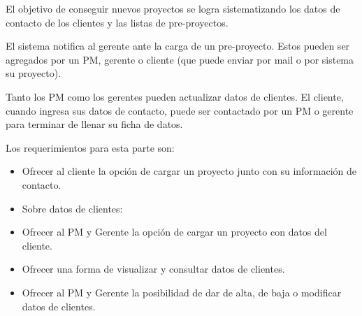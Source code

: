 El objetivo de conseguir nuevos proyectos se logra sistematizando los datos de contacto de los clientes y las listas de pre-proyectos.

El sistema notifica al gerente ante la carga de un pre-proyecto.
Estos pueden ser agregados por un PM, gerente o cliente (que puede enviar por mail o por sistema su proyecto).

Tanto los PM como los gerentes pueden actualizar datos de clientes.
El cliente, cuando ingresa sus datos de contacto, puede ser contactado por un PM o gerente para terminar de llenar su ficha de datos.

Los requerimientos para esta parte son:
\begin{itemize}
	\item Ofrecer al cliente la opción de cargar un proyecto junto con su información de contacto.
	\item Sobre datos de clientes:
	\item Ofrecer al PM y Gerente la opción de cargar un proyecto con datos del cliente.
	\item Ofrecer una forma de visualizar y consultar datos de clientes.
	\item Ofrecer al PM y Gerente la posibilidad de dar de alta, de baja o modificar datos de clientes.
\end{itemize}

